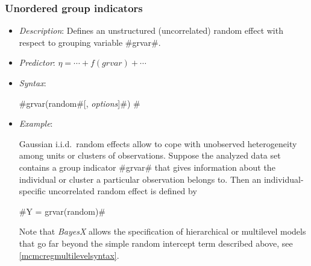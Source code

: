\begin{itemize}
%
%
%
%
%
%
%
%
\end{itemize}


\subsubsection*{Unordered group indicators}


\begin{itemize}
\item[] {\em Description}: Defines an unstructured (uncorrelated)
random effect with respect to grouping variable #grvar#. \item[]
{\em Predictor}: $\eta = \cdots + f(grvar) + \cdots$ \item[] {\em
Syntax}:

#grvar(random#[, {\em options}]#) #
\item[] {\em Example}:

Gaussian i.i.d.~random effects allow to cope with unobserved
heterogeneity among units or clusters of observations. Suppose the
analyzed data set contains a group indicator #grvar# that gives
information about the individual or cluster a particular
observation belongs to. Then an individual-specific uncorrelated
random effect is defined by

#Y = grvar(random)#

Note that {\em BayesX} allows the specification of hierarchical or multilevel models that go far beyond
the simple random intercept term described above, see \autoref{mcmcregmultilevelsyntax}.
\end{itemize}



